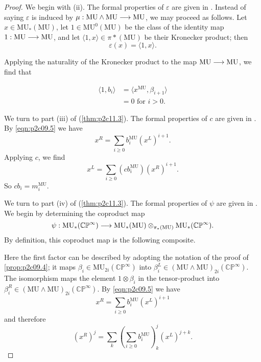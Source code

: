 \documentclass[../main]{subfiles}
\begin{document}
\begin{proof}
We begin with (ii). The formal properties of $\varepsilon$ are given in \cite{adams3}. Instead of saying $\varepsilon$ is induced by $\mu : \mathrm{MU} \wedge \mathrm{MU} \overset{}{\longrightarrow} \mathrm{MU}$, we may proceed as follows. Let $x \in \mathrm{MU}_\ast(\mathrm{MU})$, let $1 \in \mathrm{MU}^0(\mathrm{MU})$ be the class of the identity map $1 : \mathrm{MU} \overset{}{\longrightarrow} \mathrm{MU}$, and let $\langle 1, x\rangle \in \pi\ast(\mathrm{MU})$ be their Kronecker product; then $$\varepsilon(x) = \langle 1, x\rangle.$$ 

Applying the naturality of the Kronecker product to the map $\mathrm{MU} \overset{}{\longrightarrow} \mathrm{MU}$, we find that 

\begin{align*}
\langle 1, b_i\rangle & = \langle x^{\mathrm{MU}}, \beta_{i + 1}\rangle \\ & = 0 \text { for } i > 0.
\end{align*}

We turn to part (iii) of (\ref{thm:p2c11.3}). The formal properties of $c$ are given in \cite{adams3}. By \eqref{eqn:p2c09.5} we have $$x^R = \sum_{i \ge 0} b_i^{\mathrm{MU}} (x^L)^{i + 1}.$$ Applying $c$, we find $$x^L = \sum_{i \ge 0} (c b_i^{\mathrm{MU}}) (x^R)^{i + 1}.$$ So $c b_i = m_i^{\mathrm{MU}}$.

We turn to part (iv) of (\ref{thm:p2c11.3}). The formal properties of $\psi$ are given in \cite{adams3}. We begin by determining the coproduct map $$\psi : \mathrm{MU}_\ast(\mathbb {CP}^\infty) \overset{}{\longrightarrow} \mathrm{MU}_\ast(\mathrm{MU}) \otimes_{\pi_\ast(\mathrm{MU})} \mathrm{MU}_\ast(\mathbb {CP}^\infty).$$ By definition, this coproduct map is the following composite.

\begin{center}
\end{center}

Here the first factor can be described by adopting the notation of the proof of \eqref{prop:p2c09.4}; it maps $\beta_i \in \mathrm{MU}_{2i} (\mathbb {CP}^\infty)$ into $\beta_i^L \in (\mathrm{MU} \wedge \mathrm{MU})_{2i}(\mathbb {CP}^\infty)$. The isomorphism maps the element $1 \otimes \beta_i$ in the tensor-product into $\beta_i^R \in (\mathrm{MU} \wedge \mathrm{MU})_{2i}(\mathbb {CP}^\infty)$. By \eqref{eqn:p2c09.5} we have $$x^R = \sum_{i \ge 0} b_i^{\mathrm{MU}} (x^L)^{i + 1}$$ and therefore $$(x^R)^j = \sum_k \left(\sum_{i \ge 0} b_i^{\mathrm{MU}}\right)_k^j (x^L)^{j + k}.$$


\end{proof}
\end{document}
